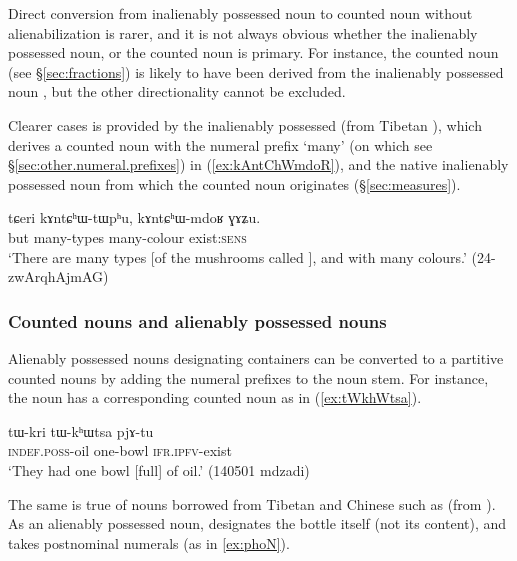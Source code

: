 Direct conversion from inalienably possessed noun to counted noun without alienabilization is rarer, and it is not always obvious whether the inalienably possessed noun, or the counted noun is primary. For instance, the counted noun  (see §\ref{sec:fractions}) is likely to have been derived from the inalienably possessed noun , but the other directionality cannot be excluded. 

Clearer cases is provided by the inalienably possessed   (from Tibetan ), which derives a counted noun with the numeral prefix  `many' (on which see §\ref{sec:other.numeral.prefixes}) in (\ref{ex:kAntChWmdoR}), and the native inalienably possessed noun  from which the counted noun  originates (§\ref{sec:measures}).

\begin{exe}
\ex \label{ex:kAntChWmdoR}
\gll  tɕeri kɤntɕʰɯ-tɯpʰu, kɤntɕʰɯ-mdoʁ ɣɤʑu. \\
 but many-types many-colour exist:\textsc{sens} \\
\glt  `There are many types [of the mushrooms called ], and with many colours.' (24-zwArqhAjmAG) 
\end{exe}

\subsubsection{Counted nouns and alienably possessed nouns}   \label{sec:CN.APN}
Alienably possessed nouns designating containers can be converted to a partitive counted nouns by adding the numeral prefixes to the noun stem. For instance, the noun  has a corresponding counted noun   as in (\ref{ex:tWkhWtsa}).

 \begin{exe}
\ex \label{ex:tWkhWtsa}
\gll tɯ-kri tɯ-kʰɯtsa pjɤ-tu \\
\textsc{indef}.\textsc{poss}-oil  one-bowl \textsc{ifr}.\textsc{ipfv}-exist \\
\glt `They had one bowl [full] of oil.' (140501 mdzadi)
\end{exe}

The same is true of nouns borrowed from Tibetan and Chinese such as  (from ). As an alienably possessed noun,  designates the bottle itself (not its content), and takes postnominal numerals (as in \ref{ex:phoN}).

